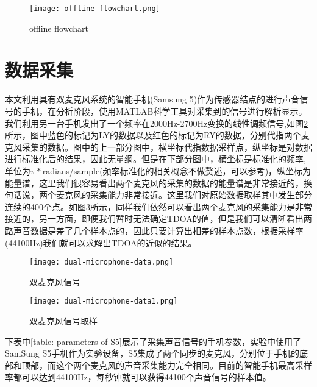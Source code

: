 \documentclass[winfonts]{njuthesis}
\begin{document}
		\begin{figure}[H]
			\centering
			\caption{offline flowchart}
			\texttt{[image: offline-flowchart.png]} 
			\label{fig: offline-flowchart}
		\end{figure}
	
	\section{数据采集}
		本文利用具有双麦克风系统的智能手机(Samsung 5)作为传感器结点的进行声音信号的手机，在分析阶段，使用MATLAB科学工具对采集到的信号进行解析显示。我们利用另一台手机发出了一个频率在2000Hz-2700Hz变换的线性调频信号,如图\ref{fig: dual-microphone-data}所示，图中蓝色的标记为LY的数据以及红色的标记为RY的数据，分别代指两个麦克风采集的数据。图中的上一部分图中，横坐标代指数据采样点，纵坐标是对数据进行标准化后的结果，因此无量纲。但是在下部分图中，横坐标是标准化的频率,单位为$\pi * $radians/sample(频率标准化的相关概念不做赘述，可以参考\cite{Normalized_frequency})，纵坐标为能量谱，这里我们很容易看出两个麦克风的采集的数据的能量谱是非常接近的，换句话说，两个麦克风的采集能力非常接近。这里我们对原始数据取样其中发生部分连续的400个点。如图\ref{fig: dual-microphone-data1}所示，同样我们依然可以看出两个麦克风的采集能力是非常接近的，另一方面，即便我们暂时无法确定TDOA的值，但是我们可以清晰看出两路声音数据是差了几个样本点的，因此只要计算出相差的样本点数，根据采样率(44100Hz)我们就可以求解出TDOA的近似的结果。
		
		\begin{figure}[H]
			\centering
			\texttt{[image: dual-microphone-data.png]} 
			\caption{双麦克风信号}
			\label{fig: dual-microphone-data}
		\end{figure}
	
		\begin{figure}[H]
			\centering
			\texttt{[image: dual-microphone-data1.png]} 
			\caption{双麦克风信号取样}
			\label{fig: dual-microphone-data1}
		\end{figure}
		
		下表中\ref{table: parameters-of-S5}展示了采集声音信号的手机参数，实验中使用了SamSung S5手机作为实验设备，S5集成了两个同步的麦克风，分别位于手机的底部和顶部，而这个两个麦克风的声音采集能力完全相同。目前的智能手机最高采样率都可以达到44100Hz，每秒钟就可以获得44100个声音信号的样本值。
		
\end{document}
